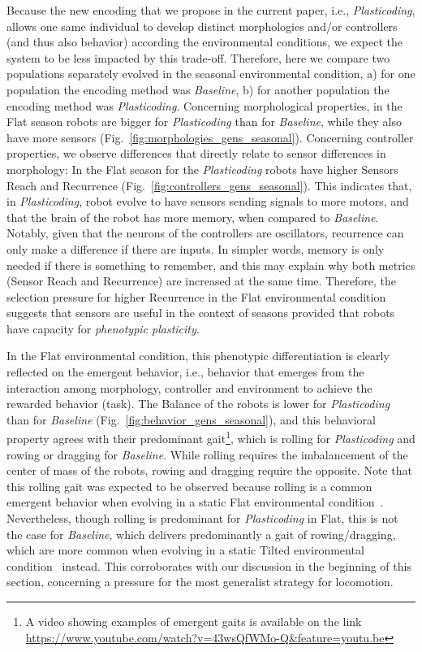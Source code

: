 \documentclass[utf8]{frontiersSCNS} %
\begin{document}
 Because the new encoding that we propose in the current paper, i.e., \textit{Plasticoding}, allows one same individual to develop distinct morphologies and/or controllers (and thus also behavior) according the environmental conditions, we expect the system to be less impacted by  this trade-off. Therefore, here we compare two populations separately evolved in the seasonal environmental condition, a) for one population the encoding method was \textit{Baseline}, b) for another population the encoding method was  \textit{Plasticoding}. 
 Concerning morphological properties, in the Flat season robots are bigger for \textit{Plasticoding} than for \textit{Baseline}, while they also have more sensors (Fig.~\ref{fig:morphologies_gens_seasonal}). Concerning controller properties, we observe differences that directly relate to sensor differences in morphology: In the Flat season for the \textit{Plasticoding} robots have higher Sensors Reach and Recurrence (Fig.~\ref{fig:controllers_gens_seasonal}). This indicates that, in \textit{Plasticoding}, robot evolve to have  sensors sending signals to more motors, and that the brain of the robot has more memory, when compared to \textit{Baseline}. Notably, given that the neurons of the controllers are oscillators, recurrence can only make a difference if there are inputs. In simpler words, memory is only needed if there is something to remember, and this may explain why both metrics (Sensor Reach and Recurrence) are increased at the same time. Therefore, the selection pressure for higher Recurrence in the Flat environmental condition suggests that sensors are useful in the context of seasons provided that robots have capacity for \textit{phenotypic plasticity}.  

In the Flat environmental condition, this phenotypic differentiation is clearly reflected on the emergent behavior, i.e., behavior that emerges from the interaction among morphology, controller and environment to achieve the rewarded behavior (task). The Balance of the robots is lower for \textit{Plasticoding} than for \textit{Baseline} (Fig.~\ref{fig:behavior_gens_seasonal}), and this behavioral property agrees with their predominant gait\footnote{A video showing examples of emergent gaits is available on the link \url{https://www.youtube.com/watch?v=43wsQfWMo-Q&feature=youtu.be}}, which is rolling for \textit{Plasticoding} and rowing or dragging for \textit{Baseline}. While rolling requires the imbalancement of the center of mass of the robots, rowing and dragging require the opposite. Note that this rolling gait was expected to be observed because rolling is a common emergent behavior when evolving in a static Flat environmental condition~\citep{miras2019effects}. Nevertheless, though rolling is predominant for \textit{Plasticoding} in Flat, this is not the case for \textit{Baseline}, which delivers predominantly a gait of rowing/dragging, which are more common when evolving in a static Tilted environmental condition~\citep{miras2019effects} instead. This corroborates with our discussion in the beginning of this section, concerning a pressure for the most generalist strategy for locomotion. 
\end{document}
